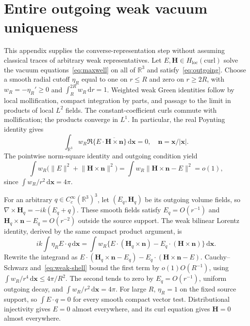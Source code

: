 \documentclass[11pt]{article}
\newcommand{\dd}{\,\mathrm{d}}
\newcommand{\norm}[1]{\lVert #1\rVert}
\newcommand{\abs}[1]{\lvert #1\rvert}
\begin{document}
\appendix
\section{Entire outgoing weak vacuum uniqueness}\label{app:weak}
This appendix supplies the converse-representation step without assuming classical traces of arbitrary weak representatives. Let $E,\mathbf H\in H_{\mathrm{loc}}(\mathrm{curl})$ solve the vacuum equations~\eqref{eq:maxwell} on all of $\mathbb R^3$ and satisfy~\eqref{eq:outgoing}. Choose a smooth radial cutoff $\eta_R$ equal to one on $r\leq R$ and zero on $r\geq2R$, with $w_R=-\eta_R'\geq0$ and $\int_R^{2R}w_R\dd r=1$. Weighted weak Green identities follow by local mollification, compact integration by parts, and passage to the limit in products of local $L^2$ fields. The constant-coefficient curls commute with mollification; the products converge in $L^1$. In particular, the real Poynting identity gives
\begin{equation}\label{eq:weak-energy}
 \int_{\mathbb R^3}w_R\Re\{E\cdot\overline{\mathbf H\times\mathbf n}\}\dd\mathbf x=0,
 \quad\mathbf n=\mathbf x/\abs{\mathbf x}.
\end{equation}
The pointwise norm-square identity and outgoing condition yield
\begin{equation}\label{eq:weak-shell}
 \int w_R\bigl(\norm E^2+\norm{\mathbf H\times\mathbf n}^2\bigr)
 =\int w_R\norm{\mathbf H\times\mathbf n-E}^2=o(1),
\end{equation}
since $\int w_R/r^2\dd\mathbf x=4\pi$.

For an arbitrary $q\in C_c^\infty(\mathbb R^3)^3$, let $(E_q,\mathbf H_q)$ be its outgoing volume fields, so $\nabla\times\mathbf H_q=-ik(E_q+q)$. These smooth fields satisfy $E_q=O(r^{-1})$ and $\mathbf H_q\times\mathbf n-E_q=O(r^{-2})$ outside the source support. The weak bilinear Lorentz identity, derived by the same compact product argument, is
\begin{equation}\label{eq:weak-lorentz}
 ik\int\eta_R E\cdot q\dd\mathbf x
 =\int w_R\{E\cdot(\mathbf H_q\times\mathbf n)
                  -E_q\cdot(\mathbf H\times\mathbf n)\}\dd\mathbf x.
\end{equation}
Rewrite the integrand as $E\cdot(\mathbf H_q\times\mathbf n-E_q)-E_q\cdot(\mathbf H\times\mathbf n-E)$. Cauchy--Schwarz and~\eqref{eq:weak-shell} bound the first term by $o(1)O(R^{-1})$, using $\int w_R/r^4\dd\mathbf x\leq4\pi/R^2$. The second tends to zero by $E_q=O(r^{-1})$, uniform outgoing decay, and $\int w_R/r^2\dd\mathbf x=4\pi$. For large $R$, $\eta_R=1$ on the fixed source support, so $\int E\cdot q=0$ for every smooth compact vector test. Distributional injectivity gives $E=0$ almost everywhere, and its curl equation gives $\mathbf H=0$ almost everywhere.
\end{document}
